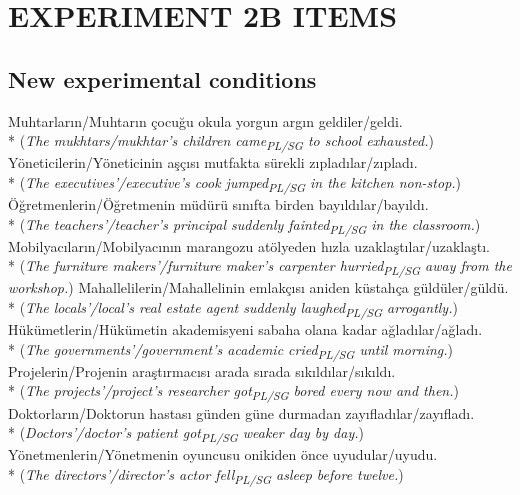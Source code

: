 

\chapter{EXPERIMENT 2B ITEMS} \label{ap:exp2bitems}
\section{New experimental conditions}

\ea Muhtarlar{\i}n/Muhtar{\i}n \c{c}ocu\u{g}u okula yorgun arg{\i}n geldiler/geldi.\\*
({\it The mukhtars/mukhtar's children came\textsubscript{PL/SG} to school exhausted.})
\ex Y\"{o}neticilerin/Y\"{o}neticinin a\c{s}\c{c}{\i}s{\i} mutfakta s\"{u}rekli z{\i}plad{\i}lar/z{\i}plad{\i}.\\*
({\it The executives'/executive's cook jumped\textsubscript{PL/SG} in the kitchen non-stop.})
\ex \"{O}\u{g}retmenlerin/\"{O}\u{g}retmenin m\"{u}d\"{u}r\"{u} s{\i}n{\i}fta birden bay{\i}ld{\i}lar/bay{\i}ld{\i}.\\*
({\it The teachers'/teacher's principal suddenly fainted\textsubscript{PL/SG} in the classroom.})
\ex Mobilyac{\i}lar{\i}n/Mobilyac{\i}n{\i}n marangozu at\"{o}lyeden h{\i}zla uzakla\c{s}t{\i}lar/uzakla\c{s}t{\i}.\\*
({\it The furniture makers'/furniture maker's carpenter hurried\textsubscript{PL/SG} away from the workshop.})
\ex Mahallelilerin/Mahallelinin emlak\c{c}{\i}s{\i} aniden k\"{u}stah\c{c}a g\"{u}ld\"{u}ler/g\"{u}ld\"{u}.\\*
({\it The locals'/local's real estate agent suddenly laughed\textsubscript{PL/SG} arrogantly.})
\ex H\"{u}k\"{u}metlerin/H\"{u}k\"{u}metin akademisyeni sabaha olana kadar a\u{g}lad{\i}lar/a\u{g}lad{\i}.\\*
({\it The governments'/government's academic cried\textsubscript{PL/SG} until morning.})
\ex Projelerin/Projenin ara\c{s}t{\i}rmac{\i}s{\i} arada s{\i}rada s{\i}k{\i}ld{\i}lar/s{\i}k{\i}ld{\i}.\\*
({\it The projects'/project's researcher got\textsubscript{PL/SG} bored every now and then.})
\ex Doktorlar{\i}n/Doktorun hastas{\i} g\"{u}nden g\"{u}ne durmadan zay{\i}flad{\i}lar/zay{\i}flad{\i}.\\*
({\it Doctors'/doctor's patient got\textsubscript{PL/SG} weaker day by day.})
\ex Y\"{o}netmenlerin/Y\"{o}netmenin oyuncusu onikiden \"{o}nce uyudular/uyudu.\\*
({\it The directors'/director's actor fell\textsubscript{PL/SG} asleep before twelve.})
